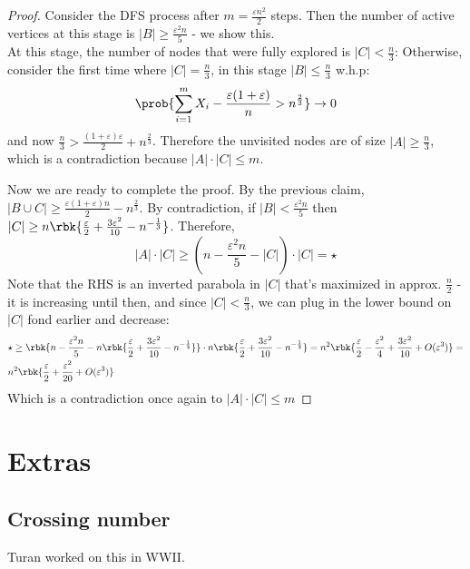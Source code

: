 \documentclass[a4paper, 11pt, oneside]{book}
\begin{document}
	\begin{proof}
		Consider the DFS process after $m = \frac{\varepsilon n^2}{2}$ steps. Then the number of active vertices at this stage is $|B| \ge \frac{\varepsilon^2 n}{5}$ - we show this.\\
		
		At this stage, the number of nodes that were fully explored is $|C| < \frac{n}{3}$: Otherwise, consider the first time where $|C| = \frac{n}{3}$, in this stage $|B| \le \frac{n}{3}$ w.h.p: 
		\begin{align*}
			\prob{\sum_{i=1}^m X_i - \frac{\varepsilon(1+\varepsilon)}{n} > n^\frac{2}{3}} \to 0
		\end{align*}
		 and now $\frac{n}{3} > \frac{(1+\varepsilon)\varepsilon}{2} + n^{\frac{2}{3}}$. Therefore the unvisited nodes are of size $|A| \ge \frac{n}{3}$, which is a contradiction because $|A|\cdot|C| \le m$.
		 
		 
		 Now we are ready to complete the proof. By the previous claim, $|B\cup C|\ge \frac{\varepsilon(1+\varepsilon)n	}{2} - n^{\frac{2}{3}}$. By contradiction, if $|B| < \frac{\varepsilon^2 n}{5}$ then $|C| \ge n\rbk{\frac{\varepsilon}{2} + \frac{3\varepsilon^2}{10} - n^{-\frac{1}{3}}}$. Therefore, 
		 \[
		 |A|\cdot |C| \ge (n-\frac{\varepsilon^2n}{5} - |C|)\cdot |C| = \star
		 \]
		 Note that the RHS is an inverted parabola in $|C|$ that's maximized in approx. $\frac{n}{2}$ - it is increasing until then, and since $|C| < \frac{n}{3}$, we can plug in the lower bound on $|C|$ fond earlier and decrease:
		 \begin{align*}
		 &\star \ge \rbk{n-\frac{\varepsilon^2n}{5} - n\rbk{\frac{\varepsilon}{2} + \frac{3\varepsilon^2}{10} - n^{-\frac{1}{3}}}}\cdot n\rbk{\frac{\varepsilon}{2} +\frac{3\varepsilon^2}{10} - n^{-\frac{1}{3}}} = n^2\rbk{\frac{\varepsilon}{2} - \frac{\varepsilon^2}{4} + \frac{3\varepsilon^2}{10} + O(\varepsilon^3)} = \\ 
		 & n^2\rbk{\frac{\varepsilon}{2} + \frac{\varepsilon^2}{20} + O(\varepsilon^3)}
		  \end{align*}
		  Which is a contradiction once again to $|A|\cdot|C| \le m$
	\end{proof}
	\appendix
	
\chapter{Extras}
\section{Crossing number}
Turan worked on this in WWII.
\end{document}
